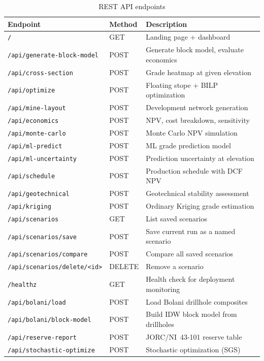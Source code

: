 \documentclass[12pt,a4paper]{article}
\begin{document}
\begin{table}[H]
\centering
\caption{REST API endpoints}
\small
\begin{tabular}{@{}lll@{}}
\toprule
\textbf{Endpoint} & \textbf{Method} & \textbf{Description} \\
\midrule
\texttt{/} & GET & Landing page + dashboard \\
\texttt{/api/generate-block-model} & POST & Generate block model, evaluate economics \\
\texttt{/api/cross-section} & POST & Grade heatmap at given elevation \\
\texttt{/api/optimize} & POST & Floating stope + BILP optimization \\
\texttt{/api/mine-layout} & POST & Development network generation \\
\texttt{/api/economics} & POST & NPV, cost breakdown, sensitivity \\
\texttt{/api/monte-carlo} & POST & Monte Carlo NPV simulation \\
\texttt{/api/ml-predict} & POST & ML grade prediction model \\
\texttt{/api/ml-uncertainty} & POST & Prediction uncertainty at elevation \\
\texttt{/api/schedule} & POST & Production schedule with DCF NPV \\
\texttt{/api/geotechnical} & POST & Geotechnical stability assessment \\
\texttt{/api/kriging} & POST & Ordinary Kriging grade estimation \\
\texttt{/api/scenarios} & GET & List saved scenarios \\
\texttt{/api/scenarios/save} & POST & Save current run as a named scenario \\
\texttt{/api/scenarios/compare} & POST & Compare all saved scenarios \\
\texttt{/api/scenarios/delete/<id>} & DELETE & Remove a scenario \\
\texttt{/healthz} & GET & Health check for deployment monitoring \\
\texttt{/api/bolani/load} & POST & Load Bolani drillhole composites \\
\texttt{/api/bolani/block-model} & POST & Build IDW block model from drillholes \\
\texttt{/api/reserve-report} & POST & JORC/NI~43-101 reserve table \\
\texttt{/api/stochastic-optimize} & POST & Stochastic optimization (SGS) \\

\end{tabular}
\end{table}
\end{document}
